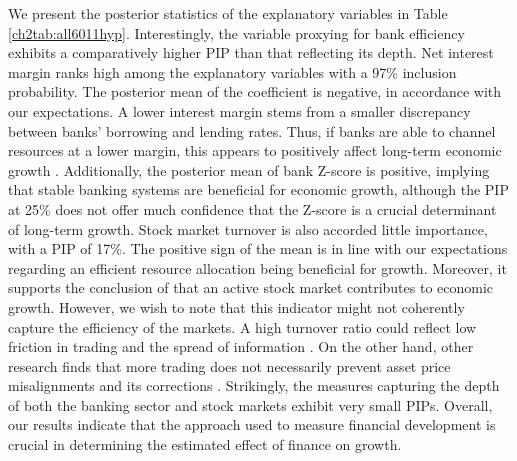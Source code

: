 We present the posterior statistics of the explanatory variables in Table \ref{ch2tab:all6011hyp}. Interestingly, the variable proxying for bank efficiency exhibits a comparatively higher \ac{PIP} than that reflecting its depth. Net interest margin ranks high among the explanatory variables with a 97\% inclusion probability. The posterior mean of the coefficient is negative, in accordance with our expectations. A lower interest margin stems from a smaller discrepancy between banks' borrowing and lending rates. Thus, if banks are able to channel resources at a lower margin, this appears to positively affect long-term economic growth \citep{Rousseau1998}. Additionally, the posterior mean of bank Z-score is positive, implying that stable banking systems are beneficial for economic growth, although the \ac{PIP} at 25\% does not offer much confidence that the Z-score is a crucial determinant of long-term growth. Stock market turnover is also accorded little importance, with a \ac{PIP} of 17\%. The positive sign of the mean is in line with our expectations regarding an efficient resource allocation being beneficial for growth. Moreover, it supports the conclusion of \citet{LevineZervos1998} that an active stock market contributes to economic growth. However, we wish to note that this indicator might not coherently capture the efficiency of the markets. A high turnover ratio could reflect low friction in trading and the spread of information \citep{Levine2005}. On the other hand, other research finds that more trading does not necessarily prevent asset price misalignments and its corrections \citep{Brunnermeier2004}. Strikingly, the measures capturing the depth of both the banking sector and stock markets exhibit very small \acp{PIP}. Overall, our results indicate that the approach used to measure financial development is crucial in determining the estimated effect of finance on growth. 

